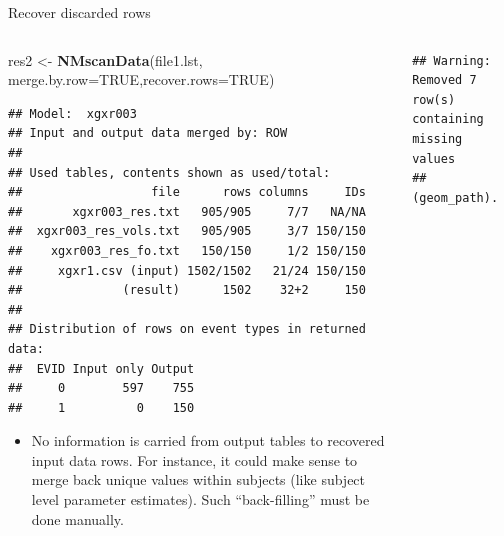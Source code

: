 \documentclass[
  8pt,
  ignorenonframetext,
  aspectratio=169]{beamer}
\newenvironment{Shaded}{\begin{snugshade}}{\end{snugshade}}
\newcommand{\DataTypeTok}[1]{\textcolor[rgb]{0.13,0.29,0.53}{#1}}
\newcommand{\KeywordTok}[1]{\textcolor[rgb]{0.13,0.29,0.53}{\textbf{#1}}}
\newcommand{\NormalTok}[1]{#1}
\newcommand{\OtherTok}[1]{\textcolor[rgb]{0.56,0.35,0.01}{#1}}
\newcommand{\StringTok}[1]{\textcolor[rgb]{0.31,0.60,0.02}{#1}}
\providecommand{\tightlist}{%
  \setlength{\itemsep}{0pt}\setlength{\parskip}{0pt}}
\begin{document}
\begin{frame}[fragile]{Recover discarded rows}
\protect\hypertarget{recover-discarded-rows}{}
\begin{columns}[T]
\begin{column}{0.45\textwidth}
\footnotesize

\begin{Shaded}
\begin{Highlighting}[]
\NormalTok{res2 \textless{}{-}}\StringTok{ }\KeywordTok{NMscanData}\NormalTok{(file1.lst,}
                   \DataTypeTok{merge.by.row=}\OtherTok{TRUE}\NormalTok{,}\DataTypeTok{recover.rows=}\OtherTok{TRUE}\NormalTok{)}
\end{Highlighting}
\end{Shaded}

\begin{verbatim}
## Model:  xgxr003 
## Input and output data merged by: ROW 
## 
## Used tables, contents shown as used/total:
##                  file      rows columns     IDs
##       xgxr003_res.txt   905/905     7/7   NA/NA
##  xgxr003_res_vols.txt   905/905     3/7 150/150
##    xgxr003_res_fo.txt   150/150     1/2 150/150
##     xgxr1.csv (input) 1502/1502   21/24 150/150
##              (result)      1502    32+2     150
## 
## Distribution of rows on event types in returned data:
##  EVID Input only Output
##     0        597    755
##     1          0    150
\end{verbatim}

\begin{itemize}
\tightlist
\item
  No information is carried from output tables to recovered input data
  rows. For instance, it could make sense to merge back unique values
  within subjects (like subject level parameter estimates). Such
  ``back-filling'' must be done manually.
\end{itemize}
\end{column}

\begin{column}{0.55\textwidth}
\begin{verbatim}
## Warning: Removed 7 row(s) containing missing values
## (geom_path).
\end{verbatim}


\end{column}
\end{columns}
\end{frame}
\end{document}
